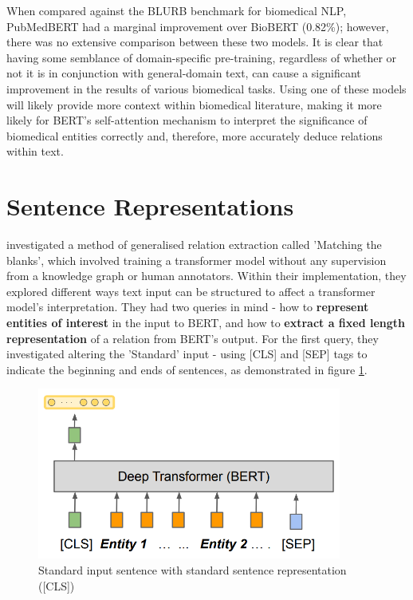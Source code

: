 \documentclass{l4proj}
\begin{document}
When compared against the BLURB benchmark for biomedical NLP, PubMedBERT had a marginal improvement over BioBERT (0.82\%); however, there was no extensive comparison between these two models. It is clear that having some semblance of domain-specific pre-training, regardless of whether or not it is in conjunction with general-domain text, can cause a significant improvement in the results of various biomedical tasks. Using one of these models will likely provide more context within biomedical literature, making it more likely for BERT's self-attention mechanism to interpret the significance of biomedical entities correctly and, therefore, more accurately deduce relations within text.

\newpage
\section{Sentence Representations}
\cite{architectures} investigated a method of generalised relation extraction called 'Matching the blanks', which involved training a transformer model without any supervision from a knowledge graph or human annotators. Within their implementation, they explored different ways text input can be structured to affect a transformer model's interpretation. They had two queries in mind - how to \textbf{represent entities of interest} in the input to BERT, and how to \textbf{extract a fixed length representation} of a relation from BERT's output. For the first query, they investigated altering the 'Standard' input - using [CLS] and [SEP] tags to indicate the beginning and ends of sentences, as demonstrated in figure \ref{fig:Standard}. 

\begin{figure}[htb]
    \centering
   \includegraphics[width=10cm]{images/Standard.png}
  \caption{Standard input sentence with standard sentence representation ([CLS])}
  \label{fig:Standard}
\end{figure}
\end{document}
